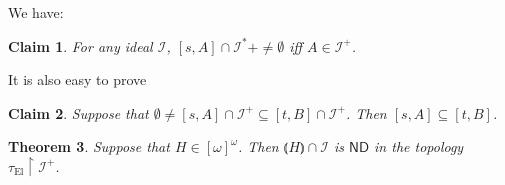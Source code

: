 \documentclass[12pt]{amsart}
\theoremstyle{plain}
\newtheorem{theorem}{Theorem}[section]
\newtheorem{claim}[theorem]{Claim}
\theoremstyle{definition}
\theoremstyle{remark}
\newcommand{\infsub}{[\omega]^{\omega}}
\newcommand{\ND}{\mathsf{ND}}
\newcommand{\calI}{\mathcal{I}}
\newcommand{\EllentuckTopology}{\tau_\mathrm{El}}
\newcommand{\lNawiasik}{\lParen}
\newcommand{\rNawiasik}{\rParen}
\begin{document}
We have:

\begin{claim}
  For any ideal $\calI$, $[s, A]\cap \calI^* + \not= \emptyset$
iff $A\in\calI^+$.
\end{claim}

It is also easy to prove
\begin{claim}
  Suppose that $\emptyset \not= [s,A] \cap \calI^+ \subseteq [t,B] \cap \calI^+$.
  Then $[s,A] \subseteq [t,B]$.
\end{claim}


\begin{theorem}
  Suppose that $H \in \infsub$. Then
  $\lNawiasik H \rNawiasik \cap\calI$ is $\ND$ in the topology
  $\EllentuckTopology\restriction\calI^+$.

\end{theorem}


\printbibliography
\end{document}
